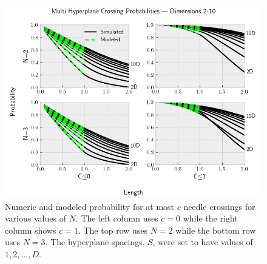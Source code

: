 \documentclass{article}
\begin{document}
\begin{figure}
	\centerline{\includegraphics[width=5in]{numeric_sim_N_le.png}}
	\caption{Numeric and modeled probability for at most $c$ needle crossings for various values of $N$.
	The left column uses $c=0$ while the right column shows $c=1$. The top row uses $N=2$ while the
	bottom row uses $N=3$. The hyperplane spacings, $S$, were set to have values of $1, 2, \hdots, D$.}
	\label{fig:numeric sim N le}
\end{figure}





\end{document}
